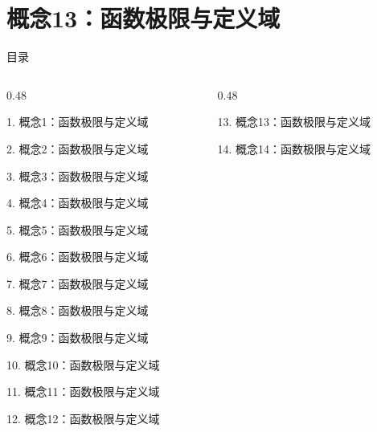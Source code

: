 \documentclass[aspectratio=169,10pt,fontset=fandol]{ctexbeamer}
\begin{document}
\section{概念13：函数极限与定义域}
\begin{frame}[t,fragile]{目录}
\small
\begin{columns}[T,onlytextwidth]
\begin{column}{0.48\textwidth}
{\color{black}\small 1. 概念1：函数极限与定义域\par}\vspace{0.22em}
{\color{black}\small 2. 概念2：函数极限与定义域\par}\vspace{0.22em}
{\color{black}\small 3. 概念3：函数极限与定义域\par}\vspace{0.22em}
{\color{black}\small 4. 概念4：函数极限与定义域\par}\vspace{0.22em}
{\color{black}\small 5. 概念5：函数极限与定义域\par}\vspace{0.22em}
{\color{black}\small 6. 概念6：函数极限与定义域\par}\vspace{0.22em}
{\color{black}\small 7. 概念7：函数极限与定义域\par}\vspace{0.22em}
{\color{black}\small 8. 概念8：函数极限与定义域\par}\vspace{0.22em}
{\color{black}\small 9. 概念9：函数极限与定义域\par}\vspace{0.22em}
{\color{black}\small 10. 概念10：函数极限与定义域\par}\vspace{0.22em}
{\color{black}\small 11. 概念11：函数极限与定义域\par}\vspace{0.22em}
{\color{black}\small 12. 概念12：函数极限与定义域\par}\vspace{0.22em}
\end{column}
\begin{column}{0.48\textwidth}
{\color{blue}\small 13. 概念13：函数极限与定义域\par}\vspace{0.22em}
{\color{gray!40}\small 14. 概念14：函数极限与定义域\par}\vspace{0.22em}

\end{column}
\end{columns}
\end{frame}
\end{document}
